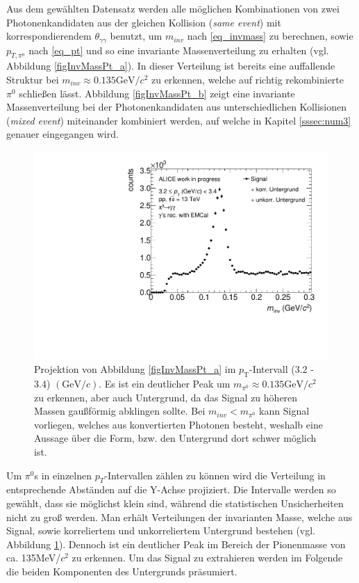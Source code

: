 \documentclass[]{article}
\begin{document}
	Aus dem gew{\"a}hlten Datensatz werden alle m{\"o}glichen Kombinationen von zwei Photonenkandidaten aus der gleichen Kollision ({\it same event}) mit korrespondierendem $\theta_{\gamma\gamma}$ benutzt, um $m_{inv}$ nach \ref{eq_invmass} zu berechnen, sowie $p_{T,\pi^{0}}$ nach \ref{eq_pt} und so eine invariante Massenverteilung zu erhalten (vgl. Abbildung \ref{figInvMassPt_a}). In dieser Verteilung ist bereits eine auffallende Struktur bei $m_{inv}\approx 0.135\text{GeV/}c^{2}$ zu erkennen, welche auf richtig rekombinierte $\pi^{0}$ schlie{\ss}en l{\"a}sst. Abbildung \ref{figInvMassPt_b} zeigt eine invariante Massenverteilung bei der Photonenkandidaten aus unterschiedlichen Kollisionen ({\it mixed event}) miteinander kombiniert werden, auf welche in Kapitel \ref{sssec:num3} genauer eingegangen wird.

	\begin{figure}[tbp]
		\centering
		\includegraphics[width=.7\linewidth]{hSignalPlusBkg.pdf}
		\caption{Projektion von Abbildung \ref{figInvMassPt_a} im $p_{\text{T}}$-Intervall (3.2 - 3.4) $(\text{GeV/}c)$. Es ist ein deutlicher Peak um $m_{\pi^{0}} \approx 0.135\text{GeV/}c^{2}$ zu erkennen, aber auch Untergrund, da das Signal zu h{\"o}heren Massen gau{\ss}f{\"o}rmig abklingen sollte. Bei $m_{inv} < m_{\pi^{0}}$ kann Signal vorliegen, welches aus konvertierten Photonen besteht, weshalb eine Aussage {\"u}ber die Form, bzw. den Untergrund dort schwer m{\"o}glich ist.}
		\label{figSignalPlusBkg}
	\end{figure}

	Um $\pi^{0}$s in einzelnen $p_{T}$-Intervallen z{\"a}hlen zu k{\"o}nnen wird die Verteilung in entsprechende Abst{\"a}nden auf die Y-Achse projiziert. Die Intervalle werden so gew{\"a}hlt, dass sie m{\"o}glichst klein sind, w{\"a}hrend die statistischen Unsicherheiten nicht zu gro{\ss} werden. Man erh{\"a}lt Verteilungen der invarianten Masse, welche aus Signal, sowie korreliertem und unkorreliertem Untergrund bestehen (vgl. Abbildung \ref{figSignalPlusBkg}). Dennoch ist ein deutlicher Peak im Bereich der Pionenmasse von ca. 135MeV/$c^{2}$ zu erkennen. Um das Signal zu extrahieren werden im Folgende die beiden Komponenten des Untergrunds pr{\"a}sumiert.
	
\end{document}
